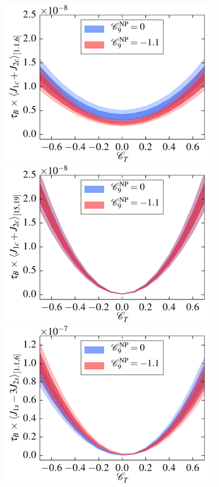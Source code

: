 \documentclass[twocolumn,epjc3]{svjour3}
\numberwithin{equation}{section}
\renewcommand{\[}{\big[}
\renewcommand{\]}{\big]}
\renewcommand{\(}{\big(}
\renewcommand{\)}{\big)}
\newlength{\relwidth}
\begin{document}
\begin{figure}
\begin{center}
    \\
    \includegraphics[width=\relwidth]{plots/pdf/ct_Kstar_J_1c_plus_J_2c1to6}
    \includegraphics[width=\relwidth]{plots/pdf/ct_Kstar_J_1c_plus_J_2c15to19}
    \\
    \includegraphics[width=\relwidth]{plots/pdf/ct_Kstar_J_1s_minus_3J_2s1to6}

\end{center}
\end{figure}
\end{document}
